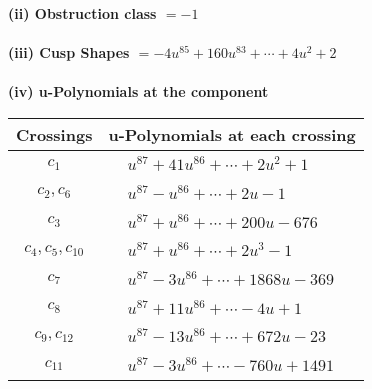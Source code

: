 \documentclass[1p]{elsarticle_modified}
\theoremstyle{definition}
\begin{document}
\flushleft \textbf{(ii) Obstruction class $= -1$}\\~\\
\flushleft \textbf{(iii) Cusp Shapes $= -4 u^{85}+160 u^{83}+\cdots+4 u^2+2$}\\~\\
\newpage\renewcommand{\arraystretch}{1}
\flushleft \textbf{(iv) u-Polynomials at the component}\newline \\
\begin{tabular}{m{50pt}|m{274pt}}
Crossings & \hspace{64pt}u-Polynomials at each crossing \\
\hline $$\begin{aligned}c_{1}\end{aligned}$$&$\begin{aligned}
&u^{87}+41 u^{86}+\cdots+2 u^2+1
\end{aligned}$\\
\hline $$\begin{aligned}c_{2},c_{6}\end{aligned}$$&$\begin{aligned}
&u^{87}- u^{86}+\cdots+2 u-1
\end{aligned}$\\
\hline $$\begin{aligned}c_{3}\end{aligned}$$&$\begin{aligned}
&u^{87}+u^{86}+\cdots+200 u-676
\end{aligned}$\\
\hline $$\begin{aligned}c_{4},c_{5},c_{10}\end{aligned}$$&$\begin{aligned}
&u^{87}+u^{86}+\cdots+2 u^3-1
\end{aligned}$\\
\hline $$\begin{aligned}c_{7}\end{aligned}$$&$\begin{aligned}
&u^{87}-3 u^{86}+\cdots+1868 u-369
\end{aligned}$\\
\hline $$\begin{aligned}c_{8}\end{aligned}$$&$\begin{aligned}
&u^{87}+11 u^{86}+\cdots-4 u+1
\end{aligned}$\\
\hline $$\begin{aligned}c_{9},c_{12}\end{aligned}$$&$\begin{aligned}
&u^{87}-13 u^{86}+\cdots+672 u-23
\end{aligned}$\\
\hline $$\begin{aligned}c_{11}\end{aligned}$$&$\begin{aligned}
&u^{87}-3 u^{86}+\cdots-760 u+1491
\end{aligned}$\\
\hline
\end{tabular}\\~\\
\end{document}
